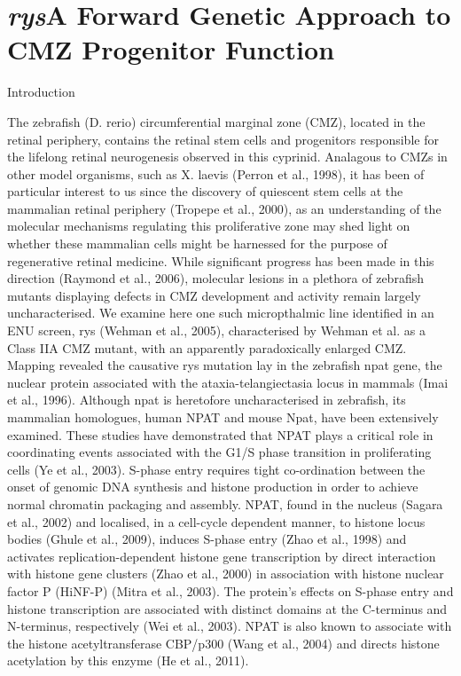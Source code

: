 \section{\textit{rys}A Forward Genetic Approach to CMZ Progenitor Function}


Introduction

The zebrafish (D. rerio) circumferential marginal zone (CMZ), located in the retinal periphery, contains the retinal stem cells and progenitors responsible for the lifelong retinal neurogenesis observed in this cyprinid. Analagous to CMZs in other model organisms, such as X. laevis (Perron et al., 1998), it has been of particular interest to us since the discovery of quiescent stem cells at the mammalian retinal periphery (Tropepe et al., 2000), as an understanding of the molecular mechanisms regulating this proliferative zone may shed light on whether these mammalian cells might be harnessed for the purpose of regenerative retinal medicine. While significant progress has been made in this direction (Raymond et al., 2006), molecular lesions in a plethora of zebrafish mutants displaying defects in CMZ development and activity remain largely uncharacterised. We examine here one such micropthalmic line identified in an ENU screen, rys (Wehman et al., 2005), characterised by Wehman et al. as a Class IIA CMZ mutant, with an apparently paradoxically enlarged CMZ.
Mapping revealed the causative rys mutation lay in the zebrafish npat gene, the nuclear protein associated with the ataxia-telangiectasia locus in mammals (Imai et al., 1996). Although npat is heretofore uncharacterised in zebrafish, its mammalian homologues, human NPAT and mouse Npat, have been extensively examined. These studies have demonstrated that NPAT plays a critical role in coordinating events associated with the G1/S phase transition in proliferating cells (Ye et al., 2003). S-phase entry requires tight co-ordination between the onset of genomic DNA synthesis and histone production in order to achieve normal chromatin packaging and assembly. NPAT, found in the nucleus (Sagara et al., 2002) and localised, in a cell-cycle dependent manner, to histone locus bodies (Ghule et al., 2009), induces S-phase entry (Zhao et al., 1998) and activates replication-dependent histone gene transcription by direct interaction with histone gene clusters (Zhao et al., 2000) in association with histone nuclear factor P (HiNF-P) (Mitra et al., 2003). The protein’s effects on S-phase entry and histone transcription are associated with distinct domains at the C-terminus and N-terminus, respectively (Wei et al., 2003). NPAT is also known to associate with the histone acetyltransferase CBP/p300 (Wang et al., 2004) and directs histone acetylation by this enzyme (He et al., 2011).
